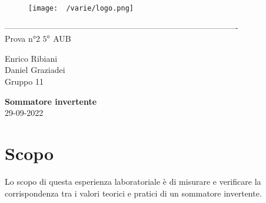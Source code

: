 \documentclass[12pt]{article}
\begin{document}
    \begin{titlepage}
    \begin{center}
\begin{figure}
    \centering
    \texttt{[image: ~/varie/logo.png]}
    \label{fig:logo}
\end{figure}
-------------------------------------------------------------------------------------\\
\vspace{2\baselineskip}
\large Prova n°2
\hfill
\large $5^a$   AUB\\
\begin{flushleft}
    \large Enrico Ribiani\\
    \large Daniel Graziadei\\
    \large Gruppo 11\\
\end{flushleft}


\vfill

\Huge{\textbf{Sommatore invertente}}\\
\vfill
\vfill
\large{29-09-2022}
\end{center}
\end{titlepage}
\tableofcontents
\newpage
\vskip 1cm
\section{Scopo}
Lo scopo di questa esperienza laboratoriale è di misurare e verificare la corrispondenza tra 
i valori teorici e pratici di un sommatore invertente.\\
\end{document}
